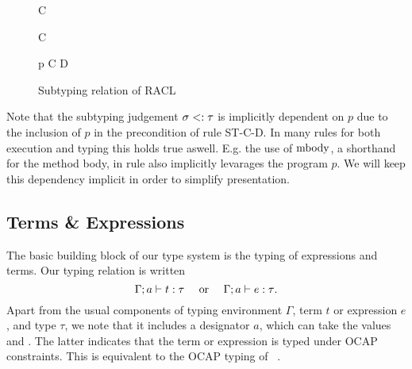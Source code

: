 \begin{figure}
  \begin{multicols}{2}

    {\tau \stof \RaclTop}

    \RuleSpace

    {\RaclBot \stof \tau}

    \RuleSpace

    {\CellType \stof \AnyRefType}

    \RuleSpace

    {C \stof \AnyRefType}

    \RuleSpace

    {\NullType \stof \CellType}
    
    \RuleSpace

    {\NullType \stof C}
  \end{multicols}

  \RuleSpace

  {p \vdash {}}
  {C \stof D}

  \caption{Subtyping relation of RACL}
  \label{fig:def_stof}
\end{figure}

\begin{remark}
  Note that the subtyping judgement $\sigma <: \tau$ is implicitly dependent
  on $p$ due to the inclusion of $p$ in the precondition of rule {\sc ST-C-D}.
  In many rules for both execution and typing this holds true aswell. E.g. the
  use of $\mbox{$\mathrm{mbody}$}$, a shorthand for the method body, in rule \ECall{} also
  implicitly levarages the program $p$. We will keep this dependency implicit in
  order to simplify presentation.
\end{remark}

\subsection{Terms \& Expressions}%
\label{sub:terms_and_expressions}

The basic building block of our type system is the typing of expressions and
terms. Our typing relation is written
\begin{equation}
  \mbox{$\Gamma;a\vdash t:\tau$} \quad \text{ or } \quad
  \mbox{$\Gamma;a\vdash e:\tau$}. \notag
\end{equation}
Apart from the usual components of typing environment $\Gamma$, term $t$ or
expression $e$, and type $\tau$, we note that it includes a designator $a$, which
can take the values \nocap{} and \ocap{}. The latter indicates that the term
or expression is typed under OCAP constraints. This is equivalent to the OCAP
typing of \LaCasa{}~\parencite{conf/oopsla/HallerL16}. 

